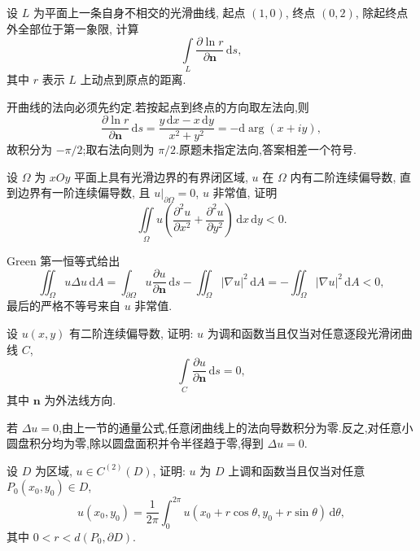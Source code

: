 \begin{example}
    设 $L$ 为平面上一条自身不相交的光滑曲线, 起点 $(1,0)$, 终点 $(0,2)$, 除起终点外全部位于第一象限, 计算
    \[
        \displaystyle\int\limits_L\dfrac{\partial\ln r}{\partial\bm n}\,\mathrm{d}s,
    \]
    其中 $r$ 表示 $L$ 上动点到原点的距离.
\end{example}
\exampleblank

\begin{solution}
    开曲线的法向必须先约定.若按起点到终点的方向取左法向,则
    \[
        \dfrac{\partial\ln r}{\partial\bm n}\,\mathrm{d}s
        =\dfrac{y\,\mathrm{d}x-x\,\mathrm{d}y}{x^2+y^2}=-\mathrm{d}\arg(x+iy),
    \]
    故积分为 $-\pi/2$;取右法向则为 $\pi/2$.原题未指定法向,答案相差一个符号.
\end{solution}

\begin{example}
    设 $\Omega$ 为 $xOy$ 平面上具有光滑边界的有界闭区域, $u$ 在 $\Omega$ 内有二阶连续偏导数, 直到边界有一阶连续偏导数, 且 $u|_{\partial\Omega}=0$, $u$ 非常值, 证明
    \[
        \displaystyle\iint\limits_\Omega u\left(\dfrac{\partial^2u}{\partial x^2}+\dfrac{\partial^2u}{\partial y^2}\right)\,\mathrm{d}x\,\mathrm{d}y<0.
    \]
\end{example}
\exampleblank

\begin{solution}
    Green 第一恒等式给出
    \[
        \displaystyle\iint_\Omega u\Delta u\,\mathrm{d}A
        =\int_{\partial\Omega}u\dfrac{\partial u}{\partial\bm n}\,\mathrm{d}s
        -\iint_\Omega|\nabla u|^2\,\mathrm{d}A
        =-\iint_\Omega|\nabla u|^2\,\mathrm{d}A<0,
    \]
    最后的严格不等号来自 $u$ 非常值.
\end{solution}

\begin{example}
    设 $u(x,y)$ 有二阶连续偏导数, 证明: $u$ 为调和函数当且仅当对任意逐段光滑闭曲线 $C$,
    \[
        \displaystyle\int\limits_C\dfrac{\partial u}{\partial\bm n}\,\mathrm{d}s=0,
    \]
    其中 $\bm n$ 为外法线方向.
\end{example}
\exampleblank

\begin{solution}
    若 $\Delta u=0$,由上一节的通量公式,任意闭曲线上的法向导数积分为零.反之,对任意小圆盘积分均为零,除以圆盘面积并令半径趋于零,得到 $\Delta u=0$.
\end{solution}

\begin{example}
    设 $D$ 为区域, $u\in C^{(2)}(D)$, 证明: $u$ 为 $D$ 上调和函数当且仅当对任意 $P_0(x_0,y_0)\in D$,
    \[
        u(x_0,y_0)=\dfrac{1}{2\pi}\int_0^{2\pi}u(x_0+r\cos\theta,y_0+r\sin\theta)\,\mathrm{d}\theta,
    \]
    其中 $0<r<d(P_0,\partial D)$.
\end{example}
\exampleblank

